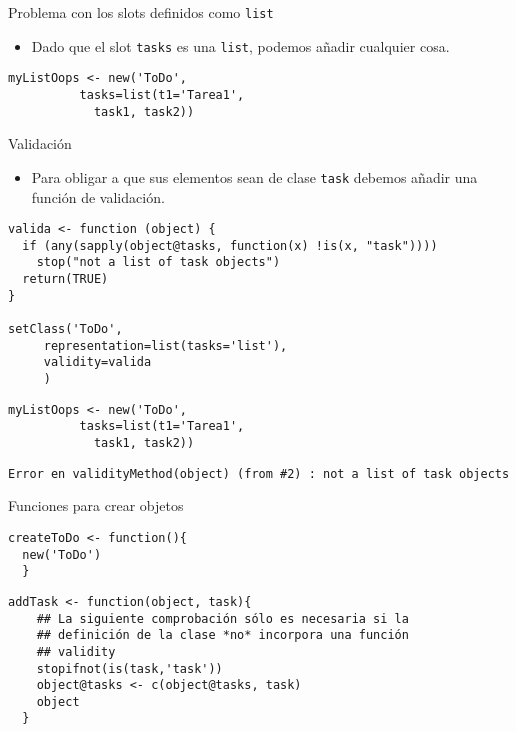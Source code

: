 \documentclass[xcolor={usenames,svgnames,dvipsnames}]{beamer}
\begin{document}
\begin{frame}[fragile,label=sec-3-1-8]{Problema con los slots definidos como \texttt{list}}
 \begin{itemize}
\item Dado que el slot \texttt{tasks} es una \texttt{list}, podemos añadir cualquier
cosa.
\end{itemize}
\lstset{language=R,numbers=none}
\begin{lstlisting}
myListOops <- new('ToDo',
		  tasks=list(t1='Tarea1',
		    task1, task2))
\end{lstlisting}
\end{frame}
\begin{frame}[fragile,label=sec-3-1-9]{Validación}
 \begin{itemize}
\item Para obligar a que sus elementos sean de clase \texttt{task} debemos añadir
una función de validación.
\end{itemize}
\lstset{language=R,numbers=none}
\begin{lstlisting}
valida <- function (object) {
  if (any(sapply(object@tasks, function(x) !is(x, "task")))) 
    stop("not a list of task objects")
  return(TRUE)
}

setClass('ToDo',
	 representation=list(tasks='list'),
	 validity=valida
	 )
\end{lstlisting}

\lstset{language=R,numbers=none}
\begin{lstlisting}
myListOops <- new('ToDo',
		  tasks=list(t1='Tarea1',
		    task1, task2))
\end{lstlisting}

\begin{verbatim}
Error en validityMethod(object) (from #2) : not a list of task objects
\end{verbatim}
\end{frame}
\begin{frame}[fragile,label=sec-3-1-10]{Funciones para crear objetos}
 \lstset{language=R,numbers=none}
\begin{lstlisting}
createToDo <- function(){
  new('ToDo')
  }
\end{lstlisting}

\lstset{language=R,numbers=none}
\begin{lstlisting}
addTask <- function(object, task){
    ## La siguiente comprobación sólo es necesaria si la
    ## definición de la clase *no* incorpora una función 
    ## validity
    stopifnot(is(task,'task'))
    object@tasks <- c(object@tasks, task)
    object
  }
\end{lstlisting}
\end{frame}
\end{document}

